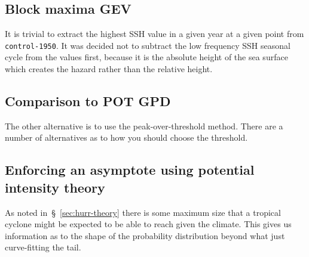 \subsection{Block maxima GEV}
It is trivial to extract the highest SSH value in a given year at a given point
from \texttt{control-1950}.
It was decided not to subtract the low frequency SSH seasonal cycle from the
values first, because it is the absolute height of the sea surface which
creates the hazard rather than the relative height.





\subsection{Comparison to POT GPD}
The other alternative is to use the peak-over-threshold method.
There are a number of alternatives as to how you should choose the
threshold.

\subsection{Enforcing an asymptote using potential intensity theory }
As noted in~§~\ref{sec:hurr-theory} there is some maximum size
that a tropical cyclone might be expected to be able to reach given
the climate. This gives us information as to the shape of the probability
distribution beyond what just curve-fitting the tail.



